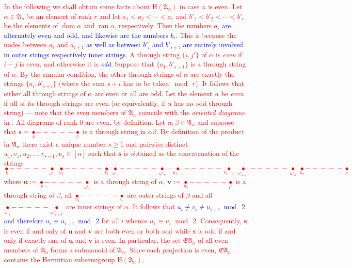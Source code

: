 \documentclass[preprint,1p,times]{elsarticle}
\DeclareMathOperator{\dom}{dom} \DeclareMathOperator{\ran}{ran}
\numberwithin{equation}{section}
\theoremstyle{remark}
\def\rrbb{{-\!\!\!-\!\!\!-\!\!\!-\!\!\!-}}
\def\red#1{\textcolor{red}{#1}}
\def\blue#1{\textcolor{blue}{#1}}
\def\H{\mathrm H}
\def\A{\mathfrak{A}}
\begin{document}
\red{
In the following we shall obtain some facts about $\H(\A_n)$ in case $n$ is even. Let $\alpha\in \A_n$ be an element of rank $r$ and let $a_1<a_2<\cdots<a_r$ and $b'_1<b'_2<\cdots<b'_r$ be the elements of $\dom \alpha$ and $\ran\alpha$, respectively. Then the numbers $a_i$  \blue{are alternately even and odd, and likewise are the numbers $b_i$}. This is because the nodes between $a_i$ and $a_{i+1}$ \blue{as well as between $b'_i$ and $b'_{i+1}$ are entirely involved in outer strings respectively  inner strings}. A through string $\{i,j'\}$ of $\alpha$ is \emph{even} if $i-j$ is even, and otherwise it is \blue{\emph{odd}}. Suppose that $\{a_1,b'_{s+1}\}$ is a through string of $\alpha$. By the annular condition, the other through strings of $\alpha$ are exactly the strings $\{a_i,b'_{s+i}\}$ (where the sum $s+i$ has to be taken $\bmod\ r$). It follows that either all through strings of $\alpha$ are even or all are odd. Let the element $\alpha$ be \emph{even} if all of its through strings are even (or equivalently, if $\alpha$ has no odd through string) --- note that the even members of $\A_n$ coincide with the \emph{oriented diagrams} in \cite{jones}. All diagrams of rank $0$ are even, by definition. Let $\alpha,\beta\in \A_n$ and suppose that
 $\mathbf{s}=\underset{k}{\bullet}\!\!\!{\rrbb}\!\!\!\underset{l'}{\bullet}$ is a through string in $\alpha\beta$. By definition of the product in $\A_n$ there exist a unique number $s\ge 1$ and pairwise distinct  $u_1,v_1,u_2,\dots,v_{s-1},u_s\in [n]$ such that $\mathbf s$ is obtained as the concatenation of the strings
 \begin{equation*}\label{*}
 \underset{k}{\bullet}\!\!\!{\rrbb}\!\!\!\underset{u'_1}{\bullet}\ \underset{u_1}{\bullet}\!\!\!{\rrbb}\!\!\!\underset{v_1}{\bullet}\ \underset{v'_1}{\bullet}\!\!\!{\rrbb}\!\!\!\underset{u'_2}{\bullet}\cdots \underset{u_{s-1}}{\bullet}\!\!\!{\!\!\!\rrbb\!\!}\!\!\!\underset{v_{s-1}}{\bullet}\ \underset{v'_{s-1}}{\bullet}\!\!\!{\!\rrbb\!\!}\!\!\!\underset{u'_s}{\bullet}\ \underset{u_s}{\bullet}\!\!\!{\rrbb}\!\!\!\underset{l'}{\bullet}
 \end{equation*}
 where
 $\mathbf{u}:=\underset{k}{\bullet}\!\!\!{\rrbb}\!\!\!\underset{u'_1}{\bullet}$ is a  through string of $\alpha$, $\mathbf{v}:=\underset{u_s}{\bullet}\!\!\!{\rrbb}\!\!\!\underset{l'}{\bullet}$ is a  through string of $\beta$, all $\underset{u_i}{\bullet}\!\!\!{\rrbb}\!\!\!\underset{v_i}{\bullet}$ are  outer strings of $\beta$ and all $\underset{v'_{i}}{\bullet}\!\!\!{\rrbb}\!\!\!\!\underset{u'_{i+1}}{\bullet}$ are inner strings of $\alpha$. It follows that \blue{$u_i\not\equiv v_i\not\equiv u_{i+1} \bmod\ 2$ and therefore $u_i\equiv u_{i+1} \bmod\ 2$} for all $i$ whence $u_1\equiv u_s\bmod\ 2$. Consequently, $\mathbf{s}$ is even if and only of $\mathbf u$ and $\mathbf v$ are both even or both odd while $\mathbf s$ is odd if and only if exactly one of $\mathbf u$ and $\mathbf v$ is even. In particular, the set $\mathfrak{EA}_n$ of all even members of $\A_n$ forms a submonoid of $\A_n$. Since each projection is even, $\mathfrak{EA}_n$ contains the Hermitian subsemigroup $\H(\A_n)$.}
\end{document}
